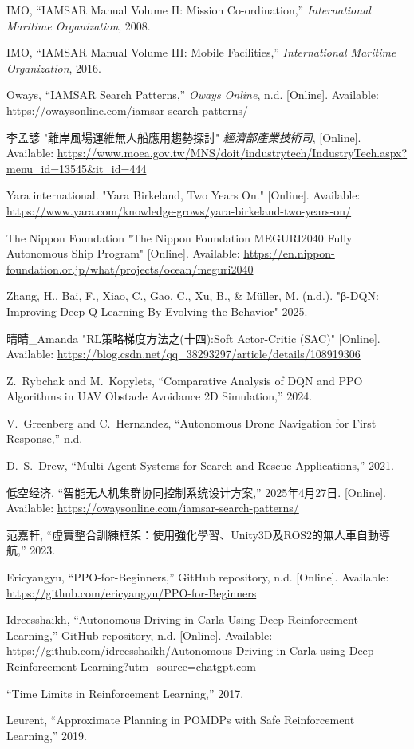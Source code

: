 \documentclass[12pt,a4paper]{article}
\begin{document}
\begin{thebibliography}{9}

IMO,
``IAMSAR Manual Volume II: Mission Co-ordination,''
\textit{International Maritime Organization},
2008.

IMO,
``IAMSAR Manual Volume III: Mobile Facilities,''
\textit{International Maritime Organization},
2016.

Oways,
``IAMSAR Search Patterns,''
\textit{Oways Online},
n.d.
[Online]. Available: \url{https://owaysonline.com/iamsar-search-patterns/}

李孟諺
"離岸風場運維無人船應用趨勢探討"
\textit{經濟部產業技術司},
 [Online]. Available: \url{https://www.moea.gov.tw/MNS/doit/industrytech/IndustryTech.aspx?menu_id=13545&it_id=444}

Yara international.
"Yara Birkeland, Two Years On."
[Online]. Available: \url{https://www.yara.com/knowledge-grows/yara-birkeland-two-years-on/}

The Nippon Foundation
"The Nippon Foundation MEGURI2040 Fully Autonomous Ship Program"
[Online]. Available: \url{https://en.nippon-foundation.or.jp/what/projects/ocean/meguri2040}

Zhang, H., Bai, F., Xiao, C., Gao, C., Xu, B., \& Müller, M. (n.d.).
"β-DQN: Improving Deep Q-Learning By Evolving the Behavior"
2025.

晴晴\_Amanda
"RL策略梯度方法之(十四):Soft Actor-Critic (SAC)"
[Online]. Available: \url{https://blog.csdn.net/qq_38293297/article/details/108919306}

Z.~Rybchak and M.~Kopylets,
``Comparative Analysis of DQN and PPO Algorithms in UAV Obstacle Avoidance 2D Simulation,''
2024.

V.~Greenberg and C.~Hernandez,
``Autonomous Drone Navigation for First Response,''
n.d.

D.~S.~Drew,
``Multi-Agent Systems for Search and Rescue Applications,''
2021.

低空经济,
``智能无人机集群协同控制系统设计方案,''
2025年4月27日.
[Online]. Available: \url{https://owaysonline.com/iamsar-search-patterns/}

范嘉軒,
``虛實整合訓練框架：使用強化學習、Unity3D及ROS2的無人車自動導航,''
2023.

Ericyangyu,
``PPO-for-Beginners,''
GitHub repository,
n.d.
[Online]. Available: \url{https://github.com/ericyangyu/PPO-for-Beginners}


Idreesshaikh,
``Autonomous Driving in Carla Using Deep Reinforcement Learning,''
GitHub repository,
n.d.
[Online]. Available: \url{https://github.com/idreesshaikh/Autonomous-Driving-in-Carla-using-Deep-Reinforcement-Learning?utm\_source=chatgpt.com}


``Time Limits in Reinforcement Learning,''
2017.

Leurent,
``Approximate Planning in POMDPs with Safe Reinforcement Learning,''
2019.

\end{thebibliography}
\end{document}
